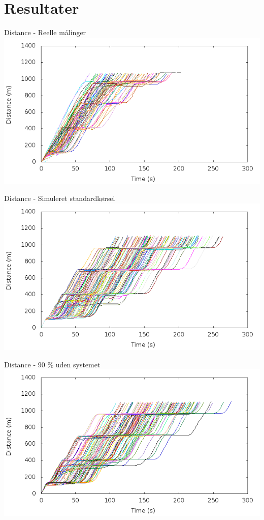 \section{Resultater}

\begin{frame}{Distance - Reelle målinger}
\includegraphics[width=1\textwidth]{../Article/images/Real/RealDistance.png}
\end{frame}

\begin{frame}{Distance - Simuleret standardkørsel}
\includegraphics[width=1\textwidth]{../Article/images/tp0/distanceUncontrolled0.png}
\end{frame}

\begin{frame}{Distance - 90 \% uden systemet}
\includegraphics[width=1\textwidth]{../Article/images/tp0/distanceUncontrolled10.png}
\end{frame}

